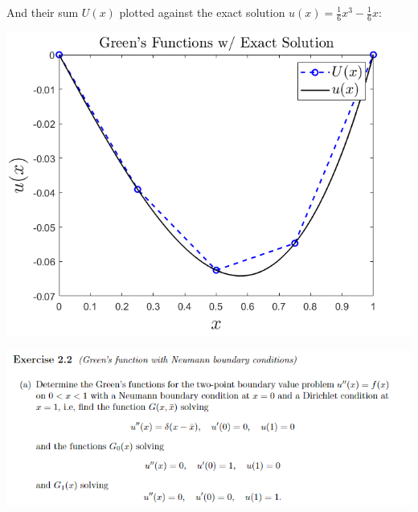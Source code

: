 \documentclass{article}
\begin{document}
And their sum $U(x)$ plotted against the exact solution $u(x) = \frac{1}{6}x^3 - \frac{1}{6}x$:
\begin{center}
    \includegraphics[scale = 0.5]{approximate with exact.png}
\end{center}

\includegraphics[scale = 0.75]{prob2a.PNG}
\newline\newline
\end{document}

